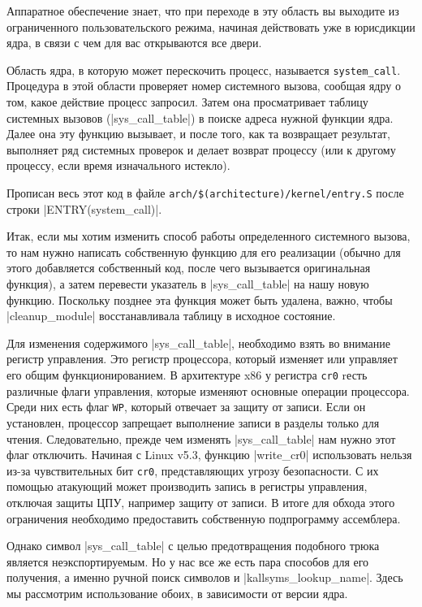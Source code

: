\documentclass[10pt, oneside]{book}
\begin{document}
Аппаратное обеспечение знает, что при переходе в эту область вы выходите из ограниченного пользовательского режима, начиная действовать уже в юрисдикции ядра, в связи с чем для вас открываются все двери.

Область ядра, в которую может перескочить процесс, называется \verb|system_call|.
Процедура в этой области проверяет номер системного вызова, сообщая ядру о том,
какое действие процесс запросил. Затем она просматривает таблицу системных вызовов (\cpp|sys_call_table|) в поиске адреса нужной функции ядра. Далее она эту функцию вызывает, и после того, как та возвращает результат, выполняет ряд системных проверок и делает возврат процессу (или к другому процессу, если время изначального истекло).

Прописан весь этот код в файле \verb|arch/$(architecture)/kernel/entry.S| после строки \cpp|ENTRY(system_call)|.

Итак, если мы хотим изменить способ работы определенного системного вызова, то нам нужно написать собственную функцию для его реализации (обычно для этого добавляется собственный код, после чего вызывается оригинальная функция), а затем перевести указатель в \cpp|sys_call_table| на нашу новую функцию. Поскольку позднее эта функция может быть удалена, важно, чтобы \cpp|cleanup_module| восстанавливала таблицу в исходное состояние.

Для изменения содержимого \cpp|sys_call_table|, необходимо взять во внимание регистр управления. Это регистр процессора, который изменяет или управляет его общим функционированием. В архитектуре x86 у регистра \verb|cr0| rесть различные флаги управления, которые изменяют основные операции процессора. Среди них есть флаг \verb|WP|, который отвечает за защиту от записи. Если он установлен, процессор запрещает выполнение записи в разделы только для чтения. Следовательно, прежде чем изменять \cpp|sys_call_table| нам нужно этот флаг отключить.
Начиная с Linux v5.3, функцию \cpp|write_cr0| использовать нельзя из-за чувствительных бит \verb|cr0|, представляющих угрозу безопасности. С их помощью атакующий может производить запись в регистры управления, отключая защиты ЦПУ, например защиту от записи. В итоге для обхода этого ограничения необходимо предоставить собственную подпрограмму ассемблера.

Однако символ \cpp|sys_call_table| с целью предотвращения подобного трюка является неэкспортируемым. Но у нас все же есть пара способов для его получения, а именно ручной поиск символов и \cpp|kallsyms_lookup_name|. Здесь мы рассмотрим использование обоих, в зависимости от версии ядра.
\end{document}
